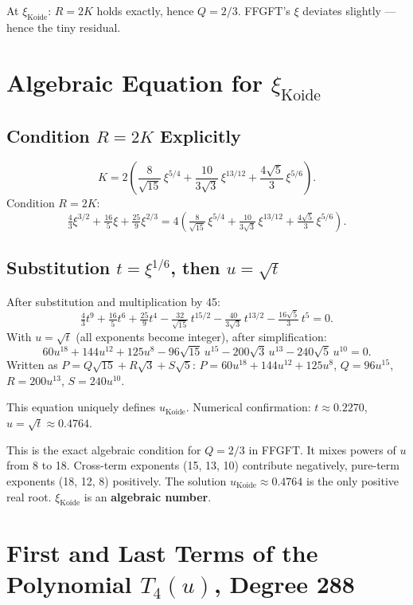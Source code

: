 At $\xi_{\text{Koide}}$: $R=2K$ holds exactly, hence $Q=2/3$.
FFGFT's $\xi$ deviates slightly --- hence the tiny residual.

\section{Algebraic Equation for $\xi_{\text{Koide}}$}


\subsection{Condition $R=2K$ Explicitly}

\[
  K = 2\!\left(
    \frac{8}{\sqrt{15}}\,\xi^{5/4}
   +\frac{10}{3\sqrt{3}}\,\xi^{13/12}
   +\frac{4\sqrt{5}}{3}\,\xi^{5/6}
  \right).
\]
Condition $R=2K$:
\[
  \tfrac{4}{3}\xi^{3/2}+\tfrac{16}{5}\xi+\tfrac{25}{9}\xi^{2/3}
  = 4\!\left(
    \tfrac{8}{\sqrt{15}}\,\xi^{5/4}
   +\tfrac{10}{3\sqrt{3}}\,\xi^{13/12}
   +\tfrac{4\sqrt{5}}{3}\,\xi^{5/6}
  \right).
\]

\subsection{Substitution $t=\xi^{1/6}$, then $u=\sqrt{t}$}

After substitution and multiplication by 45:
\[
  \tfrac{4}{3}t^9+\tfrac{16}{5}t^6+\tfrac{25}{9}t^4
  -\tfrac{32}{\sqrt{15}}\,t^{15/2}
  -\tfrac{40}{3\sqrt{3}}\,t^{13/2}
  -\tfrac{16\sqrt{5}}{3}\,t^5 = 0.
\]
With $u=\sqrt{t}$ (all exponents become integer), after simplification:
\[
  60u^{18}+144u^{12}+125u^8
  -96\sqrt{15}\,u^{15}
  -200\sqrt{3}\,u^{13}
  -240\sqrt{5}\,u^{10} = 0.
\]
Written as $P=Q\sqrt{15}+R\sqrt{3}+S\sqrt{5}$:
$P=60u^{18}+144u^{12}+125u^8$,
$Q=96u^{15}$, $R=200u^{13}$, $S=240u^{10}$.

This equation uniquely defines $u_{\text{Koide}}$.
Numerical confirmation: $t\approx0.2270$, $u=\sqrt{t}\approx0.4764$.

This is the exact algebraic condition for $Q=2/3$ in FFGFT.
It mixes powers of $u$ from 8 to 18. Cross-term exponents (15, 13, 10) contribute
negatively, pure-term exponents (18, 12, 8) positively.
The solution $u_{\text{Koide}}\approx0.4764$ is the only positive real root.
$\xi_{\text{Koide}}$ is an \textbf{algebraic number}.

\section{First and Last Terms of the Polynomial $T_4(u)$, Degree 288}


